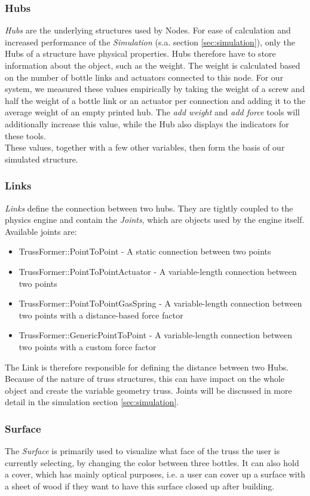 \subsubsection{Hubs}
\textit{Hubs} are the underlying structures used by Nodes. For ease of calculation and increased performance of the \textit{Simulation} (s.a. section \ref{sec:simulation}), only the Hubs of a structure have physical properties. Hubs therefore have to store information about the object, such as the weight. The weight is calculated based on the number of bottle links and actuators connected to this node. For our system, we measured these values empirically by taking the weight of a screw and half the weight of a bottle link or an actuator per connection and adding it to the average weight of an empty printed hub. The \textit{add weight} and \textit{add force} tools will additionally increase this value, while the Hub also displays the indicators for these tools.\\
These values, together with a few other variables, then form the basis of our simulated structure.

\subsubsection{Links}
\textit{Links} define the connection between two hubs. They are tightly coupled to the physics engine and contain the \textit{Joints}, which are objects used by the engine itself. Available joints are:
\begin{itemize}
    \item TrussFormer::PointToPoint - A static connection between two points
    \item TrussFormer::PointToPointActuator - A variable-length connection between two points
    \item TrussFormer::PointToPointGasSpring - A variable-length connection between two points with a distance-based force factor
    \item TrussFormer::GenericPointToPoint - A variable-length connection between two points with a custom force factor
\end{itemize}
The Link is therefore responsible for defining the distance between two Hubs. Because of the nature of truss structures, this can have impact on the whole object and create the variable geometry truss. Joints will be discussed in more detail in the simulation section \ref{sec:simulation}.

\subsubsection{Surface}
The \textit{Surface} is primarily used to visualize what face of the truss the user is currently selecting, by changing the color between three bottles. It can also hold a cover, which has mainly optical purposes, i.e. a user can cover up a surface with a sheet of wood if they want to have this surface closed up after building.

